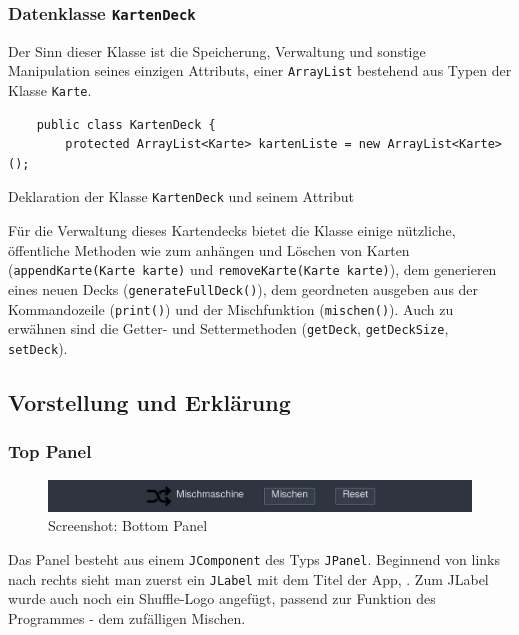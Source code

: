 \documentclass[a4paper,11pt]{article}
\begin{document}
\subsubsection{Datenklasse \texttt{KartenDeck}}

Der Sinn dieser Klasse ist die Speicherung, Verwaltung und sonstige Manipulation seines einzigen Attributs, einer \texttt{ArrayList} bestehend aus Typen der Klasse \texttt{Karte}.

\begin{listing}[H]
    \begin{verbatim}
    public class KartenDeck {
        protected ArrayList<Karte> kartenListe = new ArrayList<Karte>();
    \end{verbatim}
    \caption{Deklaration der Klasse \texttt{KartenDeck} und seinem Attribut}
\end{listing}

Für die Verwaltung dieses Kartendecks bietet die Klasse einige nützliche, öffentliche Methoden wie zum anhängen und Löschen von Karten (\texttt{appendKarte(Karte karte)} und \texttt{removeKarte(Karte karte)}), dem generieren eines neuen Decks (\texttt{generateFullDeck()}), dem geordneten ausgeben aus der Kommandozeile (\texttt{print()}) und der Mischfunktion (\texttt{mischen()}). Auch zu erwähnen sind die Getter- und Settermethoden (\texttt{getDeck}, \texttt{getDeckSize}, \texttt{setDeck}).


\subsection{Vorstellung und Erklärung}
\subsubsection{Top Panel}
\begin{figure}[H]
    \centering
    \includegraphics[width=.9\textwidth]{media/top-panel.jpg}
    \caption{Screenshot: Bottom Panel}
\end{figure}

Das Panel besteht aus einem \texttt{JComponent} des Typs \texttt{JPanel}. Beginnend von links nach rechts sieht man zuerst ein \texttt{JLabel} mit dem Titel der App, . Zum JLabel wurde auch noch ein Shuffle-Logo angefügt, passend zur Funktion des Programmes - dem zufälligen Mischen.\\
\end{document}

